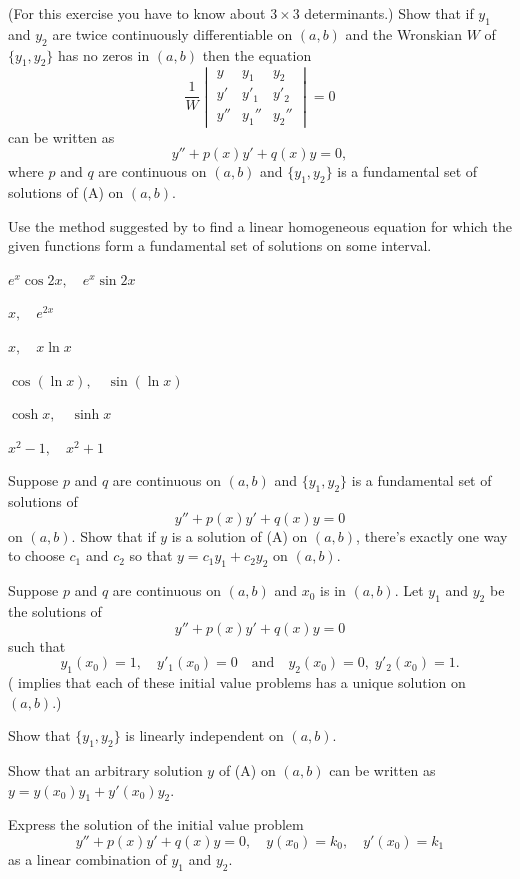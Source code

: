 \begin{exerciselist}
\item\label{exer:5.1.34}(For this exercise you have to know about $3\times 3$
determinants.)
Show that if $y_1$ and $y_2$ are twice continuously differentiable on
$(a,b)$ and the Wronskian $W$ of $\{y_1,y_2\}$ has no zeros in
$(a,b)$ then the equation
\[
\frac{1}{W} \begin{vmatrix}
y & y_1 & y_2 \\
y' & y'_1 & y'_2 \\
y'' & y_1'' & y_2''
\end{vmatrix}=0
\]
can be written as
\[
y''+p(x)y'+q(x)y=0,
\tag{A}
\]
where $p$ and $q$ are continuous on $(a,b)$ and $\{y_1,y_2\}$ is a
fundamental set of solutions of (A) on $(a,b)$.

\item\label{exer:5.1.35}Use the method suggested by  to find a linear
homogeneous equation for which the given functions form a fundamental
set of solutions on some interval.

\begin{alist*}[columns=2]
\item $e^x \cos 2x, \quad e^x \sin 2x$
\item $x, \quad e^{2x}$
\item $x, \quad x \ln x$
\item $\cos (\ln x), \quad \sin (\ln x)$
\item $\cosh x, \quad \sinh x$
\item $ x^2-1, \quad x^2+1$
\end{alist*}

\item\label{exer:5.1.36}Suppose  $p$ and $q$ are continuous  on  $(a,b)$ and
  $\{y_1,y_2\}$ is
a fundamental set of solutions of
\[
y''+p(x)y'+q(x)y=0
\tag{A}
\]
on $(a,b)$. Show that if $y$ is a solution of (A)
on  $(a,b)$, there's exactly one way  to choose $c_1$ and $c_2$
so that $y=c_1y_1+c_2y_2$ on  $(a,b)$.

\item\label{exer:5.1.37}Suppose  $p$ and $q$ are continuous  on  $(a,b)$ and
$x_0$ is in  $(a,b)$. Let $y_1$ and $y_2$ be the solutions of
\[
y''+p(x)y'+q(x)y=0
\tag{A}
\]
 such that
\[
y_1(x_0)=1, \quad y'_1(x_0)=0\quad\text{and}\quad
y_2(x_0)=0,\;  y'_2(x_0)=1.
\]
( implies that each of these initial value
problems
has a unique solution on $(a,b)$.)
\begin{alist}
\item %
Show that  $\{y_1,y_2\}$ is linearly independent on  $(a,b)$.
\item %
Show that an arbitrary solution  $y$  of
(A) on  $(a,b)$ can be written as
$y=y(x_0)y_1+y'(x_0)y_2$.
\item %
Express the solution of the initial value problem
\[
y''+p(x)y'+q(x)y=0,\quad y(x_0)=k_0,\quad y'(x_0)=k_1
\]
as a linear combination of $y_1$ and $y_2$.
\end{alist}


\end{exerciselist}
